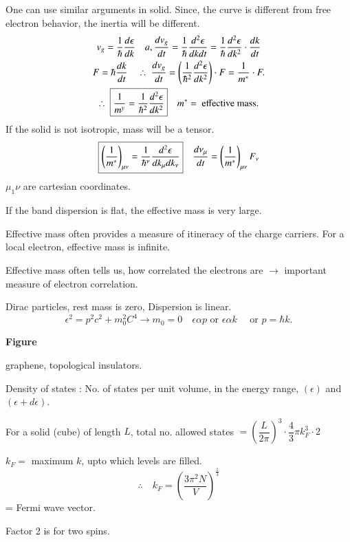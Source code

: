 One can use similar arguments in solid. Since, the curve is different from free electron behavior, the inertia will be different.
\begin{gather*}
v_{g}=\dfrac{1}{\hbar}\dfrac{d\epsilon}{dk}\quad a, \dfrac{dv_{g}}{dt}=\dfrac{1}{\hbar}\dfrac{d^{2}\epsilon}{dkdt}=\dfrac{1}{\hbar}\dfrac{d^{2}\epsilon}{dk^{2}}\cdot \dfrac{dk}{dt}\\
F=\hbar \dfrac{dk}{dt}\quad \therefore \ \dfrac{dv_{g}}{dt}=\left(\dfrac{1}{\hbar^{2}}\dfrac{d^{2}\epsilon}{dk^{2}}\right)\cdot F=\dfrac{1}{m^{*}}\cdot F.\\
\therefore \ \fbox{$\dfrac{1}{m^{y}}=\dfrac{1}{\hbar^{2}}\dfrac{d^{2}\epsilon}{dk^{2}}$}\quad m^{*} = \text{ effective mass.}
\end{gather*}
If the solid is not isotropic, mass will be a tensor.
$$
\fbox{$\left(\dfrac{1}{m^{*}}\right)_{\mu\nu}=\dfrac{1}{\hbar^{\nu}}\dfrac{d^{2}\epsilon}{dk_{\mu}dk_{\nu}}$}\quad \dfrac{d\nu_{\mu}}{dt}=\left(\dfrac{1}{m^{*}}\right)_{\mu\nu}F_{\nu}
$$
$\mu_{1}\nu$ are cartesian coordinates.

If the band dispersion is flat, the effective mass is very large.

Effective mass often provides a measure of itineracy of the charge carriers. For a local electron, effective mass is infinite.

Effective mass often tells us, how correlated the electrons are $\to$ important measure of electron correlation.

Dirac particles, rest mass is zero, Dispersion is linear.
$$
\epsilon^{2}=p^{2}c^{2}+m^{2}_{0}C^{4}\to m_{0}=0\quad \epsilon\alpha p\text{ or } \epsilon\alpha k\quad \text{ or } p=\hbar k.
$$
\begin{center}
{\bf Figure}
\end{center}
graphene, topological insulators.

Density of states : No. of states per unit volume, in the energy range, $(\epsilon)$ and $(\epsilon+d\epsilon)$.

For a solid (cube) of length $L$, total no. allowed states $=\left(\dfrac{L}{2\pi}\right)^{3}\cdot\dfrac{4}{3}\pi k^{3}_{F}\cdot 2$

$k_{F}=$ maximum $k$, upto which levels are filled.
$$
\therefore\quad k_{F}=\left(\dfrac{3\pi^{2}N}{V}\right)^{\frac{1}{3}}
$$
= Fermi wave vector.

Factor 2 is for two spins.

